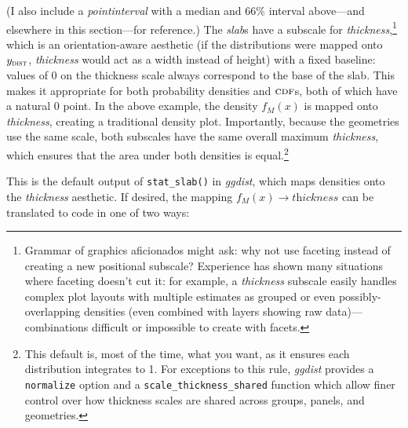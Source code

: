 \documentclass[journal]{vgtc}                     %
\begin{document}
(I also include a \textit{pointinterval} with a median and 66\% interval above---and elsewhere in this section---for reference.) The \textit{slab}s have a subscale for \textit{thickness},\footnote{Grammar of graphics aficionados might ask: why not use faceting instead of creating a new positional subscale? Experience has shown many situations where faceting doesn't cut it: for example, a \textit{thickness} subscale easily handles complex plot layouts with multiple estimates as grouped or even possibly-overlapping densities (even combined with layers showing raw data)---combinations difficult or impossible to create with facets.
} which is an orientation-aware aesthetic (if the distributions were mapped onto $y_\textsc{dist}$, \textit{thickness} would act as a width instead of height) with a fixed baseline: values of 0 on the thickness scale always correspond to the base of the slab. This makes it appropriate for both probability densities and $\textsc{cdf}$s, both of which have a natural 0 point. In the above example, the density $f_M(x)$ is mapped onto \textit{thickness}, creating a traditional density plot. Importantly, because the geometries use the same scale, both subscales have the same overall maximum \textit{thickness}, which ensures that the area under both densities is equal.\footnote{This default is, most of the time, what you want, as it ensures each distribution integrates to 1. For exceptions to this rule, \textit{ggdist} provides a \texttt{normalize} option and a \texttt{scale\_thickness\_shared} function which allow finer control over how thickness scales are shared across groups, panels, and geometries.} 

This is the default output of \texttt{stat\_slab()} in \textit{ggdist}, which maps densities onto the \textit{thickness} aesthetic. If desired, the mapping $f_M(x) \rightarrow \textit{thickness}$ can be translated to code in one of two ways:
\end{document}
